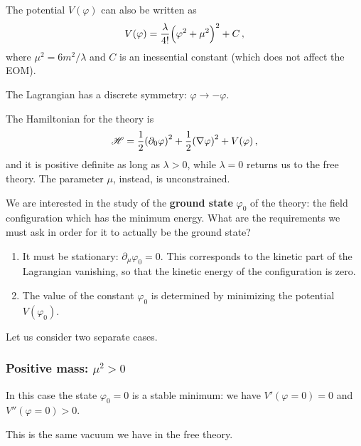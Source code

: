 \documentclass[main.tex]{subfiles}
\begin{document}
The potential \(V(\varphi )\) can also be written as 
%
\begin{align}
V(\varphi ) = \frac{\lambda}{4!} \qty(\varphi^2 + \mu^2)^2 + C
\,,
\end{align}
%
where \(\mu^2 = 6 m^2 / \lambda \) and \(C\) is an inessential constant (which does not affect the EOM). 

The Lagrangian has a discrete symmetry: \(\varphi \to -\varphi \). 

The Hamiltonian for the theory is 
%
\begin{align}
\mathscr{H} = \frac{1}{2} \qty(\partial_0 \varphi )^2 + \frac{1}{2} \qty(\nabla \varphi )^2 + V(\varphi )
\,,
\end{align}
%
and it is positive definite as long as \(\lambda > 0\), while \(\lambda = 0\) returns us to the free theory. The parameter \(\mu \), instead, is unconstrained.

We are interested in the study of the \textbf{ground state} \(\varphi_0 \) of the theory: the field configuration which has the minimum energy. 
What are the requirements we must ask in order for it to actually be the ground state? 

\begin{enumerate}
    \item It must be stationary: \(\partial_{\mu } \varphi_0 = 0\). This corresponds to the kinetic part of the Lagrangian vanishing, so that the kinetic energy of the configuration is zero. 
    \item The value of the constant \(\varphi_0 \) is determined by minimizing the potential \(V (\varphi_0 )\). 
\end{enumerate}


Let us consider two separate cases. 

\subsubsection{Positive mass: \(\mu^2> 0\)} 

In this case the state \(\varphi_0  = 0\) is a stable minimum: we have \(V' (\varphi  = 0) = 0\) and \(V'' (\varphi = 0) > 0\). 

This is the same vacuum we have in the free theory. 
\end{document}
